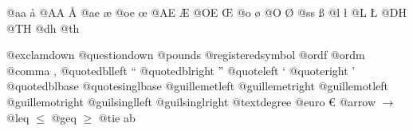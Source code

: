 \documentclass{book}
\begin{document}
\begin{titlepage}
@aa \aa{}
@AA \AA{}
@ae \ae{}
@oe \oe{}
@AE \AE{}
@OE \OE{}
@o \o{}
@O \O{}
@ss \ss{}
@l \l{}
@L \L{}
@DH \DH{}
@TH \TH{}
@dh \dh{}
@th \th{}

@exclamdown \textexclamdown{}
@questiondown \textquestiondown{}
@pounds \textsterling{}
@registeredsymbol \circledR{}
@ordf \textordfeminine{}
@ordm \textordmasculine{}
@comma ,
@quotedblleft \textquotedblleft{}
@quotedblright \textquotedblright{}
@quoteleft \textquoteleft{}
@quoteright \textquoteright{}
@quotedblbase \quotedblbase{}
@quotesinglbase \quotesinglbase{}
@guillemetleft \guillemotleft{}
@guillemetright \guillemotright{}
@guillemotleft \guillemotleft{}
@guillemotright \guillemotright{}
@guilsinglleft \guilsinglleft{}
@guilsinglright \guilsinglright{}
@textdegree \textdegree{}
@euro \euro{}
@arrow $\rightarrow{}$
@leq $\leq{}$
@geq $\geq{}$
@tie a\hbox{}b


\end{titlepage}
\end{document}
